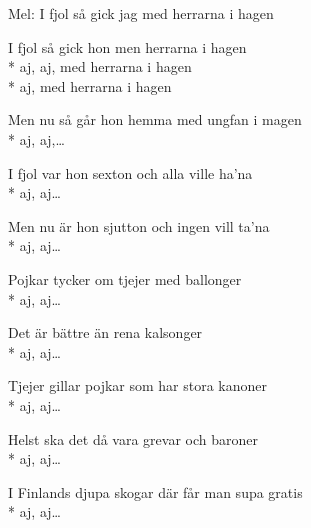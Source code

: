 \begin{SongText}
    \begin{SongInfo}
        Mel: I fjol så gick jag med herrarna i hagen
    \end{SongInfo}
    \begin{SongVerse}
        I fjol så gick hon men herrarna i hagen\\*%
        aj, aj, med herrarna i hagen\\*%
        aj, med herrarna i hagen
    \end{SongVerse}
    \begin{SongVerse}
        Men nu så går hon hemma med ungfan i magen\\*%
        aj, aj,…
    \end{SongVerse}
    \begin{SongVerse}
        I fjol var hon sexton och alla ville ha’na\\*%
        aj, aj…
    \end{SongVerse}
    \begin{SongVerse}
        Men nu är hon sjutton och ingen vill ta’na\\*%
        aj, aj…
    \end{SongVerse}
    \begin{SongVerse}
        Pojkar tycker om tjejer med ballonger\\*%
        aj, aj…
    \end{SongVerse}
    \begin{SongVerse}
        Det är bättre än rena kalsonger\\*%
        aj, aj…
    \end{SongVerse}
    \begin{SongVerse}
        Tjejer gillar pojkar som har stora kanoner\\*%
        aj, aj…
    \end{SongVerse}
    \begin{SongVerse}
        Helst ska det då vara grevar och baroner\\*%
        aj, aj…
    \end{SongVerse}
    \begin{SongVerse}
        I Finlands djupa skogar där får man supa gratis\\*%
        aj, aj…
    \end{SongVerse}
\end{SongText}